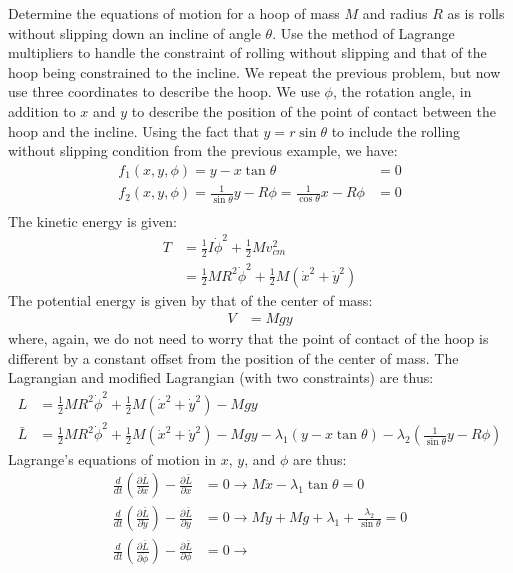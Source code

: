 \begin{example}{0pt}{Determine the equations of motion for a hoop of mass $M$ and radius $R$ as is rolls without slipping down an incline of angle $\theta$. Use the method of Lagrange multipliers to handle the constraint of rolling without slipping and that of the hoop being constrained to the incline.}{}
We repeat the previous problem, but now use three coordinates to describe the hoop. We use $\phi$, the rotation angle, in addition to $x$ and $y$ to describe the position of the point of contact between the hoop and the incline. Using the fact that $y=r\sin{\theta}$ to include the rolling without slipping condition from the previous example, we have:
\begin{align*}
f_1(x,y,\phi)=y-x\tan{\theta}&=0\\
f_2(x,y,\phi)=\frac{1}{\sin{\theta}}y-R\phi=\frac{1}{\cos{\theta}}x-R\phi&=0\\
\end{align*}
The kinetic energy is given:
\begin{align*}
T&=\frac{1}{2}I\dot{\phi}^2+\frac{1}{2}Mv_{cm}^2\\
&=\frac{1}{2}MR^2\dot{\phi}^2+\frac{1}{2}M(\dot{x}^2+\dot{y}^2)
\end{align*}
The potential energy is given by that of the center of mass:
\begin{align*}
V&=Mgy
\end{align*}
where, again, we do not need to worry that the point of contact of the hoop is different by a constant offset from the position of the center of mass. The Lagrangian and modified Lagrangian (with two constraints) are thus:
\begin{align*}
L&=\frac{1}{2}MR^2\dot{\phi}^2+\frac{1}{2}M(\dot{x}^2+\dot{y}^2)-Mgy\\
\bar{L}&=\frac{1}{2}MR^2\dot{\phi}^2+\frac{1}{2}M(\dot{x}^2+\dot{y}^2)-Mgy-\lambda_1(y-x\tan{\theta})-\lambda_2(\frac{1}{\sin{\theta}}y-R\phi)
\end{align*}
Lagrange's equations of motion in $x$, $y$, and $\phi$ are thus:
\begin{align*}
\frac{d}{dt}\left(\frac{\partial \bar{L}}{\partial \dot{x}} \right) - \frac{\partial \bar{L}}{\partial x}&=0\to
 M\ddot{x}-\lambda_1\tan{\theta}=0\\
\frac{d}{dt}\left(\frac{\partial \bar{L}}{\partial \dot{y}} \right) - \frac{\partial \bar{L}}{\partial y}&=0\to
 M\ddot{y}+Mg+\lambda_1+\frac{\lambda_2}{\sin{\theta}}=0\\
\frac{d}{dt}\left(\frac{\partial \bar{L}}{\partial \dot{\phi}} \right) - \frac{\partial \bar{L}}{\partial \phi}&=0\to

\end{align*}
\end{example}
